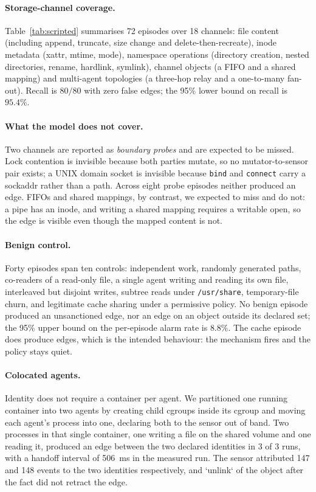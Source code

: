 \documentclass[11pt]{article}
\begin{document}
\paragraph{Storage-channel coverage.} Table~\ref{tab:scripted} summarises 72
episodes over 18 channels: file content (including append, truncate, size change
and delete-then-recreate), inode metadata (xattr, mtime, mode), namespace
operations (directory creation, nested directories, rename, hardlink, symlink),
channel objects (a FIFO and a shared mapping) and multi-agent topologies (a
three-hop relay and a one-to-many fan-out). Recall is $80/80$ with zero false
edges; the 95\% lower bound on recall is $95.4\%$.

\paragraph{What the model does not cover.} Two channels are reported as
\emph{boundary probes} and are expected to be missed. Lock contention is invisible
because both parties mutate, so no mutator-to-sensor pair exists; a UNIX domain
socket is invisible because \texttt{bind} and \texttt{connect} carry a sockaddr
rather than a path. Across eight probe episodes neither produced an edge. FIFOs
and shared mappings, by contrast, we expected to miss and do not: a pipe has an
inode, and writing a shared mapping requires a writable open, so the edge is
visible even though the mapped content is not.

\paragraph{Benign control.} Forty episodes span ten controls: independent work,
randomly generated paths, co-readers of a read-only file, a single agent writing
and reading its own file, interleaved but disjoint writes, subtree reads under
\texttt{/usr/share}, temporary-file churn, and legitimate cache sharing under a
permissive policy. No benign episode produced an unsanctioned edge, nor an edge on
an object outside its declared set; the 95\% upper bound on the per-episode alarm
rate is $8.8\%$. The cache episode does produce edges, which is the intended
behaviour: the mechanism fires and the policy stays quiet.

\paragraph{Colocated agents.} Identity does not require a container per agent. We
partitioned one running container into two agents by creating child cgroups inside
its cgroup and moving each agent's process into one, declaring both to the sensor
out of band. Two processes in that single container, one writing a file on the
shared volume and one reading it, produced an edge between the two declared
identities in 3 of 3 runs, with a handoff interval of 506~ms in the measured run.
The sensor attributed 147 and 148 events to the two identities respectively, and
`unlink` of the object after the fact did not retract the edge.
\end{document}
